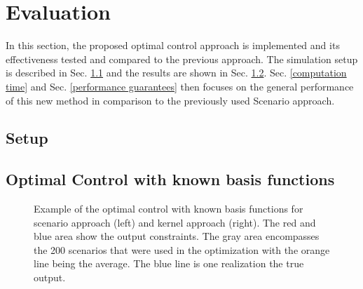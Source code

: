 \chapter{Evaluation}

In this section, the proposed optimal control approach is implemented and its effectiveness tested and compared to the previous approach. The simulation setup is described in Sec. \ref{setup} and the results are shown in Sec. \ref{optimal control}. Sec. \ref{computation time} and Sec. \ref{performance guarantees} then focuses on the general performance of this new method in comparison to the previously used Scenario approach.

\section{Setup} \label{setup}

\section{Optimal Control with known basis functions} \label{optimal control}

\begin{figure}[htb]
\centering
{}
\quad %
\caption{Example of the optimal control with known basis functions for scenario approach (left) and kernel approach (right). The red and blue area show the output constraints. The gray area encompasses the 200 scenarios that were used in the optimization with the orange line being the average. The blue line is one realization the true output.}
\end{figure}

